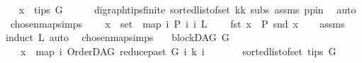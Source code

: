 \begin{isabellebody}
\ \isamarkupfalse%
\ {\isachardoublequoteopen}x\ {\isasymin}\ tips\ G{\isachardoublequoteclose}\isanewline
\ \ \ \ \isamarkupfalse%
\ digraph{\isachardot}{\kern0pt}tips{\isacharunderscore}{\kern0pt}finite\ sorted{\isacharunderscore}{\kern0pt}list{\isacharunderscore}{\kern0pt}of{\isacharunderscore}{\kern0pt}set{\isacharparenleft}{\kern0pt}{}{\isacharparenright}{\kern0pt}\ kk\ subs\ assms\ pp{\isacharunderscore}{\kern0pt}in\ \isamarkupfalse%
\ auto\isanewline
{}\isamarkupfalse%
%
\endisatagproof
{\isafoldproof}%
%
\isadelimproof
\isanewline
%
\endisadelimproof
\isanewline
\isanewline
{}\isamarkupfalse%
\ chosen{\isacharunderscore}{\kern0pt}map{\isacharunderscore}{\kern0pt}simps{}{\isacharcolon}{\kern0pt}\isanewline
\ \ \ {\isachardoublequoteopen}\ x\ {\isasymin}\ set\ \ {\isacharparenleft}{\kern0pt}map\ {\isacharparenleft}{\kern0pt}{\isasymlambda}i{\isachardot}{\kern0pt}\ {\isacharparenleft}{\kern0pt}P\ i{\isacharcomma}{\kern0pt}\ i{\isacharparenright}{\kern0pt}{\isacharparenright}{\kern0pt}\ L{\isacharparenright}{\kern0pt}{\isachardoublequoteclose}\isanewline
\ \ \ \ {\isachardoublequoteopen}fst\ x\ {\isacharequal}{\kern0pt}\ P\ {\isacharparenleft}{\kern0pt}snd\ x{\isacharparenright}{\kern0pt}{\isachardoublequoteclose}\isanewline
%
\isadelimproof
\ \ %
\endisadelimproof
%
\isatagproof
{}\isamarkupfalse%
\ assms\isanewline
{}\isamarkupfalse%
{\isacharparenleft}{\kern0pt}induct\ L{\isacharcomma}{\kern0pt}\ auto{\isacharparenright}{\kern0pt}\ \isamarkupfalse%
%
\endisatagproof
{\isafoldproof}%
%
\isadelimproof
\isanewline
%
\endisadelimproof
\isanewline
{}\isamarkupfalse%
\ chosen{\isacharunderscore}{\kern0pt}map{\isacharunderscore}{\kern0pt}simps{\isacharcolon}{\kern0pt}\isanewline
\ \ \ {\isachardoublequoteopen}blockDAG\ G{\isachardoublequoteclose}\isanewline
\ \ \ {\isachardoublequoteopen}x\ {\isacharequal}{\kern0pt}\ map\ {\isacharparenleft}{\kern0pt}{\isasymlambda}i{\isachardot}{\kern0pt}\ {\isacharparenleft}{\kern0pt}OrderDAG\ {\isacharparenleft}{\kern0pt}reduce{\isacharunderscore}{\kern0pt}past\ G\ i{\isacharparenright}{\kern0pt}\ k{\isacharcomma}{\kern0pt}\ i{\isacharparenright}{\kern0pt}{\isacharparenright}{\kern0pt}\isanewline
\ \ \ \ \ \ \ {\isacharparenleft}{\kern0pt}sorted{\isacharunderscore}{\kern0pt}list{\isacharunderscore}{\kern0pt}of{\isacharunderscore}{\kern0pt}set\ {\isacharparenleft}{\kern0pt}tips\ G{\isacharparenright}{\kern0pt}{\isacharparenright}{\kern0pt}{\isachardoublequoteclose}\ \isanewline

\end{isabellebody}
